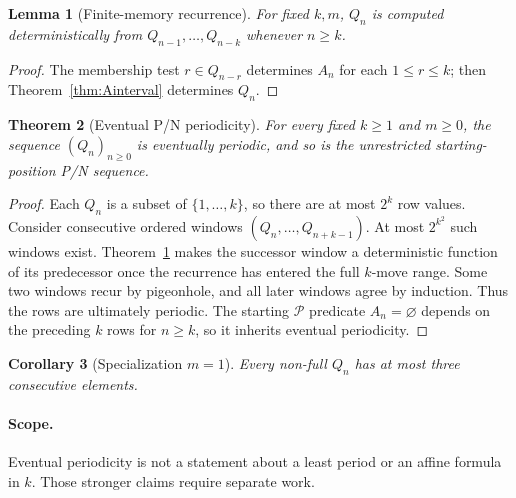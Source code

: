 \documentclass[11pt]{article}
\newtheorem{theorem}{Theorem}[section]
\newtheorem{lemma}[theorem]{Lemma}
\newtheorem{corollary}[theorem]{Corollary}
\newcommand{\Pset}{\mathcal{P}}
\begin{document}
\begin{lemma}[Finite-memory recurrence]\label{lem:memory}
For fixed $k,m$, $Q_n$ is computed deterministically from $Q_{n-1},\ldots,Q_{n-k}$ whenever $n\ge k$.
\end{lemma}
\begin{proof}The membership test $r\in Q_{n-r}$ determines $A_n$ for each $1\le r\le k$; then Theorem~\ref{thm:Ainterval} determines $Q_n$.\end{proof}

\begin{theorem}[Eventual P/N periodicity]\label{thm:Aperiod}
For every fixed $k\ge1$ and $m\ge0$, the sequence $(Q_n)_{n\ge0}$ is eventually periodic, and so is the unrestricted starting-position P/N sequence.
\end{theorem}
\begin{proof}
Each $Q_n$ is a subset of $\{1,\ldots,k\}$, so there are at most $2^k$ row values. Consider consecutive ordered windows $(Q_n,\ldots,Q_{n+k-1})$. At most $2^{k^2}$ such windows exist. Theorem~\ref{lem:memory} makes the successor window a deterministic function of its predecessor once the recurrence has entered the full $k$-move range. Some two windows recur by pigeonhole, and all later windows agree by induction. Thus the rows are ultimately periodic. The starting $\Pset$ predicate $A_n=\varnothing$ depends on the preceding $k$ rows for $n\ge k$, so it inherits eventual periodicity.
\end{proof}
\begin{corollary}[Specialization $m=1$] Every non-full $Q_n$ has at most three consecutive elements.\end{corollary}
\paragraph{Scope.} Eventual periodicity is not a statement about a least period or an affine formula in $k$. Those stronger claims require separate work.
\end{document}
